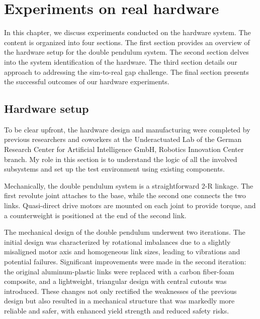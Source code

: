 \chapter{Experiments on real hardware}
In this chapter, we discuss experiments conducted on the hardware system. The content is organized into four sections. The first section provides an overview of the hardware setup for the double pendulum system. The second section delves into the system identification of the hardware. The third section details our approach to addressing the sim-to-real gap challenge. The final section presents the successful outcomes of our hardware experiments.

\section{Hardware setup}
To be clear upfront, the hardware design and manufacturing were completed by previous researchers and coworkers at the Underactuated Lab of the German Research Center for Artificial Intelligence GmbH, Robotics Innovation Center branch. My role in this section is to understand the logic of all the involved subsystems and set up the test environment using existing components.

Mechanically, the double pendulum system is a straightforward 2-R linkage. The first revolute joint attaches to the base, while the second one connects the two links. Quasi-direct drive motors are mounted on each joint to provide torque, and a counterweight is positioned at the end of the second link.

The mechanical design of the double pendulum underwent two iterations. The initial design was characterized by rotational imbalances due to a slightly misaligned motor axis and homogeneous link sizes, leading to vibrations and potential failures. Significant improvements were made in the second iteration: the original aluminum-plastic links were replaced with a carbon fiber-foam composite, and a lightweight, triangular design with central cutouts was introduced. These changes not only rectified the weaknesses of the previous design but also resulted in a mechanical structure that was markedly more reliable and safer, with enhanced yield strength and reduced safety risks.

